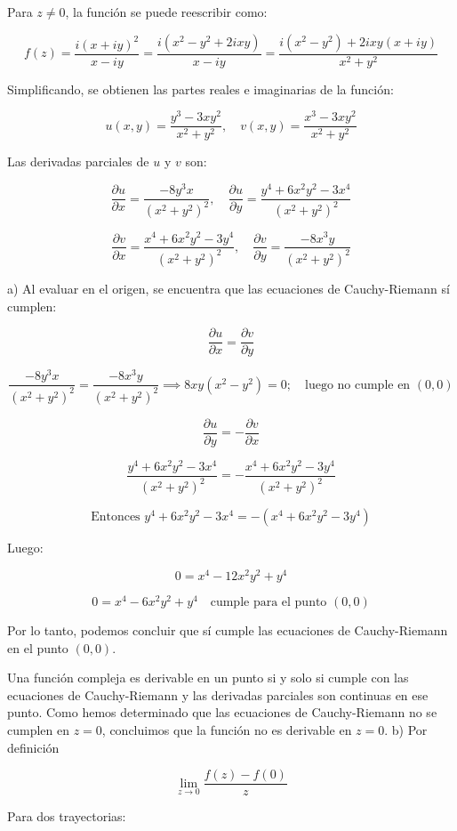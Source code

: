 \documentclass[a4paper,12pt]{article}
\begin{document}
Para \( z \neq 0 \), la función se puede reescribir como:

\[
f(z) = \frac{i(x + iy)^2}{x - iy} = \frac{i(x^2 - y^2 + 2ixy)}{x - iy} = \frac{i(x^2 - y^2) + 2ixy(x + iy)}{x^2 + y^2}
\]

Simplificando, se obtienen las partes reales e imaginarias de la función:

\[
u(x, y) = \frac{y^3 - 3xy^2}{x^2 + y^2}, \quad v(x, y) = \frac{x^3 - 3xy^2}{x^2 + y^2}
\]

Las derivadas parciales de \(u\) y \(v\) son:

\[
\frac{\partial u}{\partial x} = \frac{-8y^3 x}{(x^2 + y^2)^2}, \quad \frac{\partial u}{\partial y} = \frac{y^4 + 6x^2y^2 - 3x^4}{(x^2 + y^2)^2}
\]

\[
\frac{\partial v}{\partial x} = \frac{x^4 + 6x^2y^2 - 3y^4}{(x^2 + y^2)^2}, \quad \frac{\partial v}{\partial y} = \frac{-8x^3y}{(x^2 + y^2)^2}
\]

a) Al evaluar en el origen, se encuentra que las ecuaciones de Cauchy-Riemann sí cumplen:

\[
\frac{\partial u}{\partial x} = \frac{\partial v}{\partial y}
\]

\[
\frac{-8y^3x}{(x^2 + y^2)^2} = \frac{-8x^3y}{(x^2 + y^2)^2} \implies 8xy(x^2 - y^2) = 0; \quad \text{luego no cumple en } (0, 0)
\]

\[
\frac{\partial u}{\partial y} = -\frac{\partial v}{\partial x}
\]

\[
\frac{y^4 + 6x^2y^2 - 3x^4}{(x^2 + y^2)^2} = -\frac{x^4 + 6x^2y^2 - 3y^4}{(x^2 + y^2)^2}
\]

\[
\text{Entonces } y^4 + 6x^2y^2 - 3x^4 = -(x^4 + 6x^2y^2 - 3y^4)
\]

Luego:

\[
0 = x^4 - 12x^2y^2 + y^4
\]

\[
0 = x^4 - 6x^2y^2 + y^4 \quad \text{cumple para el punto } (0, 0)
\]

Por lo tanto, podemos concluir que sí cumple las ecuaciones de Cauchy-Riemann en el punto \((0, 0)\).

Una función compleja es derivable en un punto si y solo si cumple con las ecuaciones de Cauchy-Riemann y las derivadas parciales son continuas en ese punto. Como hemos determinado que las ecuaciones de Cauchy-Riemann no se cumplen en \(z = 0\), concluimos que la función no es derivable en \(z = 0\).
b) Por definición

\[
\lim_{z \to 0} \frac{f(z) - f(0)}{z}
\]

Para dos trayectorias:
\end{document}
